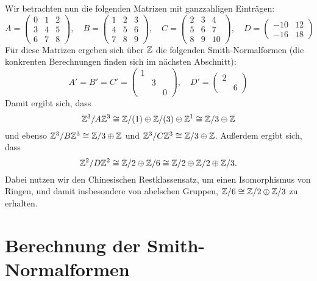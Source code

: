 \documentclass[a4paper,10pt,numbers=noenddot]{scrartcl}
\begin{document}
Wir betrachten nun die folgenden Matrizen mit ganzzahligen Einträgen:
\[
    A
  = \begin{pmatrix}
      0 & 1 & 2 \\
      3 & 4 & 5 \\
      6 & 7 & 8
    \end{pmatrix},
  \quad
    B
  = \begin{pmatrix}
      1 & 2 & 3 \\
      4 & 5 & 6 \\
      7 & 8 & 9
    \end{pmatrix},
  \quad
    C
  = \begin{pmatrix}
      2 & 3 &  4  \\
      5 & 6 &  7  \\
      8 & 9 & 10
    \end{pmatrix},
  \quad
    D
  = \begin{pmatrix}
      -10 & 12  \\
      -16 & 18
    \end{pmatrix}
\]
Für diese Matrizen ergeben sich über $\mathbb{Z}$ die folgenden Smith-Normalformen (die konkrenten Berechnungen finden sich im nächsten Abschnitt):
\[
    A'
  = B'
  = C'
  = \begin{pmatrix}
      1 &   &   \\
        & 3 &   \\
        &   & 0
    \end{pmatrix},
  \quad
    D'
  = \begin{pmatrix}
      2 &    \\
        & 6
    \end{pmatrix}
\]
Damit ergibt sich, dass
\[
        \mathbb{Z}^3 / A \mathbb{Z}^3
  \cong \mathbb{Z}/(1) \oplus \mathbb{Z}/(3) \oplus \mathbb{Z}^1
  \cong \mathbb{Z}/3 \oplus \mathbb{Z}
\]
und ebenso $\mathbb{Z}^3 / B \mathbb{Z}^3 \cong \mathbb{Z}/3 \oplus \mathbb{Z}$ und $\mathbb{Z}^3 / C \mathbb{Z}^3 \cong \mathbb{Z}/3 \oplus \mathbb{Z}$.
Außerdem ergibt sich, dass
\[
        \mathbb{Z}^2 / D \mathbb{Z}^2
  \cong \mathbb{Z}/2 \oplus \mathbb{Z}/6
  \cong \mathbb{Z}/2 \oplus \mathbb{Z}/2 \oplus \mathbb{Z}/3.
\]
Dabei nutzen wir den Chinesischen Restklassensatz, um einen Iso\-mor\-phis\-mus von Ringen, und damit insbesondere von abelschen Gruppen, $\mathbb{Z}/6 \cong \mathbb{Z}/2 \oplus \mathbb{Z}/3$ zu erhalten.





\section{Berechnung der Smith-Normalformen}
\end{document}

